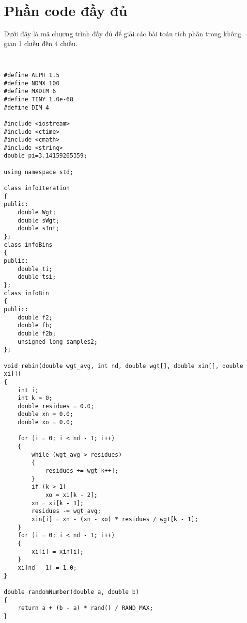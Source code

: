 \chapter{Phần code đầy đủ}\label{append:A}

\lstset{
    frame=single
    language=C++,
    }
    
Dưới đây là mã chương trình đầy đủ để giải các bài toán tích phân trong không gian 1 chiều đến 4 chiều.\par~\par

\begin{lstlisting}[firstnumber=1]
#define ALPH 1.5
#define NDMX 100
#define MXDIM 6
#define TINY 1.0e-68
#define DIM 4

#include <iostream>
#include <ctime>
#include <cmath>
#include <string>
double pi=3.14159265359;

using namespace std;

class infoIteration
{
public:
    double Wgt;
    double sWgt;
    double sInt;
};
class infoBins
{
public:
    double ti;
    double tsi;
};
class infoBin
{
public:
    double f2;
    double fb;
    double f2b;
    unsigned long samples2;
};

void rebin(double wgt_avg, int nd, double wgt[], double xin[], double xi[])
{
    int i;
    int k = 0;
    double residues = 0.0;
    double xn = 0.0;
    double xo = 0.0;

    for (i = 0; i < nd - 1; i++)
    {
        while (wgt_avg > residues)
        {
            residues += wgt[k++];
        }
        if (k > 1)
            xo = xi[k - 2];
        xn = xi[k - 1];
        residues -= wgt_avg;
        xin[i] = xn - (xn - xo) * residues / wgt[k - 1];
    }
    for (i = 0; i < nd - 1; i++)
    {
        xi[i] = xin[i];
    }
    xi[nd - 1] = 1.0;
}

double randomNumber(double a, double b)
{
    return a + (b - a) * rand() / RAND_MAX;
}
\end{lstlisting}

